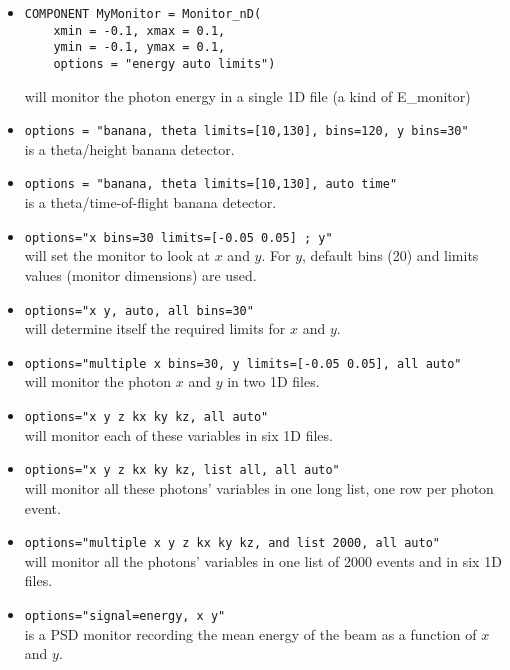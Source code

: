 \begin{itemize}
\item{
\begin{verbatim}
COMPONENT MyMonitor = Monitor_nD(
    xmin = -0.1, xmax = 0.1,
    ymin = -0.1, ymax = 0.1,
    options = "energy auto limits")
\end{verbatim}
will monitor the photon energy in a single 1D file (a kind of E\_monitor)}
\item{\texttt{options = "banana, theta limits=[10,130], bins=120, y bins=30"} \\
    is a theta/height banana detector.}
\item{\texttt{options = "banana, theta limits=[10,130], auto time"} \\
    is a theta/time-of-flight banana detector.}

\item{\texttt{options="x bins=30 limits=[-0.05 0.05] ; y"} \\
    will set the monitor to look at $x$ and $y$. For $y$, default bins (20)
    and limits values (monitor dimensions) are used.}

\item{\texttt{options="x y, auto, all bins=30"} \\
    will determine itself the required limits for $x$ and $y$.}

\item{\texttt{options="multiple x bins=30, y limits=[-0.05 0.05], all auto"} \\
will monitor the photon $x$ and $y$ in two 1D files.}
\item{\texttt{options="x y z kx ky kz, all auto"} \\
will monitor each of these variables in six 1D files.}
\item{\texttt{options="x y z kx ky kz, list all, all auto"} \\
will monitor all these photons' variables in one long list, one row per photon event.}
\item{\texttt{options="multiple x y z kx ky kz, and list 2000, all auto"} \\
    will monitor all the photons' variables in one list of 2000 events
    and in six 1D files.}
\item{\texttt{options="signal=energy, x y"} \\
    is a PSD monitor recording the mean energy of the beam as a function of $x$ and $y$.}
\end{itemize}

